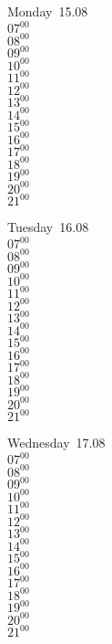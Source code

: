 \documentclass[11pt,a4paper]{book}\usepackage[]{graphicx}\usepackage[]{color}
\begin{document}
\begin{headerbox}
\end{headerbox}
\begin{weekdaybox}
  Monday~15.08\\
  { 
  \vfill
  $07^{00}$\\
$08^{00}$\\
$09^{00}$\\
$10^{00}$\\
$11^{00}$\\
$12^{00}$\\
$13^{00}$\\
$14^{00}$\\
$15^{00}$\\
$16^{00}$\\
$17^{00}$\\
$18^{00}$\\
$19^{00}$\\
$20^{00}$\\
$21^{00}$\\
  }
\end{weekdaybox}
\begin{weekdaybox}
  Tuesday~16.08\\
  { 
  \vfill
  $07^{00}$\\
$08^{00}$\\
$09^{00}$\\
$10^{00}$\\
$11^{00}$\\
$12^{00}$\\
$13^{00}$\\
$14^{00}$\\
$15^{00}$\\
$16^{00}$\\
$17^{00}$\\
$18^{00}$\\
$19^{00}$\\
$20^{00}$\\
$21^{00}$\\
  }
\end{weekdaybox}
\begin{weekdaybox}
  Wednesday~17.08\\
  { 
  \vfill
  $07^{00}$\\
$08^{00}$\\
$09^{00}$\\
$10^{00}$\\
$11^{00}$\\
$12^{00}$\\
$13^{00}$\\
$14^{00}$\\
$15^{00}$\\
$16^{00}$\\
$17^{00}$\\
$18^{00}$\\
$19^{00}$\\
$20^{00}$\\
$21^{00}$\\
  }
\end{weekdaybox}
\end{document}
